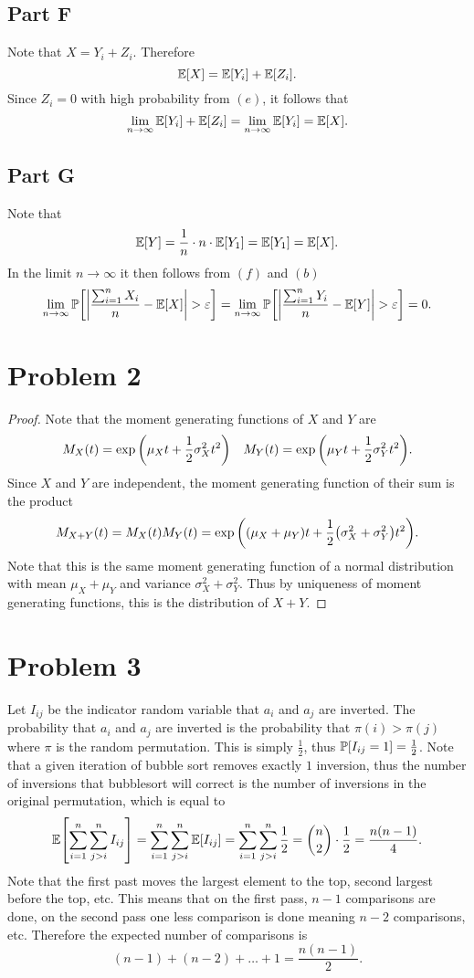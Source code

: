 \documentclass{eeleyes}
\begin{document}
\subsection*{Part F}
Note that $X = Y_i + Z_i$. Therefore
\[
    \expp{X} = \expp{Y_i} + \expp{Z_i}
.\]
Since $Z_i = 0$ with high probability from $(e)$, it follows that
\[
    \lim_{n \to \infty} \expp{Y_i} + \expp{Z_i} = \lim_{n \to \infty} \expp{Y_i} = \expp{X}
.\]

\subsection*{Part G}
Note that
\[
    \expp{Y} = \frac{1}{n} \cdot n \cdot \expp{Y_1} = \expp{Y_1} = \expp{X}
.\]
In the limit $n \to \infty$ it then follows from $(f)$ and $(b)$
\[
    \lim_{n \to \infty} \prob{\qty|\frac{\sum_{i=1}^n X_i}{n} - \expp{X}| > \eps} 
    = \lim_{n \to \infty} \prob{\qty|\frac{\sum_{i=1}^n Y_i}{n} - \expp{Y}| > \eps} = 0
.\]

\section*{Problem 2}
\begin{proof}
    Note that the moment generating functions of $X$ and $Y$ are
    \[
        M_X(t) = \exp\qty(\mu_X t + \frac{1}{2} \sigma_X^2 t^2) \quad M_Y(t) = \exp\qty(\mu_Y t + \frac{1}{2} \sigma_Y^2 t^2)
    .\]
    Since $X$ and $Y$ are independent, the moment generating function of their sum is the product
    \[
        M_{X + Y}(t) = M_X(t) M_Y(t) = \exp\qty((\mu_X + \mu_Y) t + \frac{1}{2} \qty(\sigma_X^2 + \sigma_Y^2) t^2)
    .\]
    Note that this is the same moment generating function of a normal distribution with mean $\mu_X + \mu_Y$ and variance $\sigma_X^2 + \sigma_Y^2$. Thus by uniqueness of moment generating functions, this is the distribution of $X + Y$.
\end{proof}

\section*{Problem 3}
Let $I_{ij}$ be the indicator random variable that $a_i$ and $a_j$ are inverted. The probability that $a_i$ and $a_j$ are inverted is the probability that $\pi(i) > \pi(j)$ where $\pi$ is the random permutation. This is simply $\frac{1}{2}$, thus $\prob{I_{ij} = 1} = \frac{1}{2}$. Note that a given iteration of bubble sort removes exactly $1$ inversion, thus the number of inversions that bubblesort will correct is the number of inversions in the original permutation, which is equal to
\[
    \expp{\sum_{i=1}^n \sum_{j > i}^n I_{ij}} = \sum_{i=1}^n \sum_{j > i}^n \expp{I_{ij}} = \sum_{i=1}^n \sum_{j>i}^n \frac{1}{2} = \binom{n}{2} \cdot \frac{1}{2} = \frac{n(n-1)}{4}
.\]
Note that the first past moves the largest element to the top, second largest before the top, etc. This means that on the first pass, $n - 1$ comparisons are done, on the second pass one less comparison is done meaning $n-2$ comparisons, etc. Therefore the expected number of comparisons is
\[
    (n-1) + (n-2) + \ldots + 1 = \frac{n(n-1)}{2}
.\]
\end{document}
